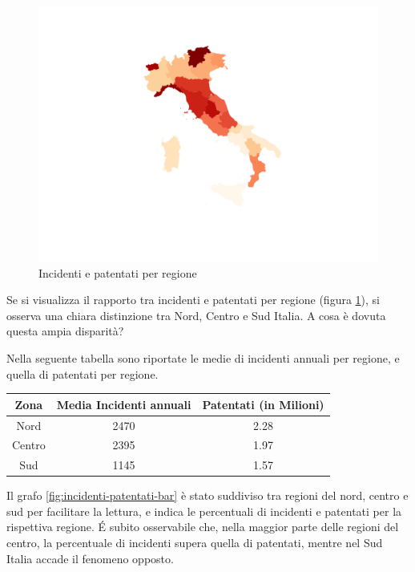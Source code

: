 \documentclass[a4paper,12pt]{report}
\begin{document}
\begin{figure}
    \hfill\includegraphics[width=0.8\linewidth]{../src/incidenti/incidenti_aci/mappe_regioni/incidenti_patenti_italia.png}\hspace*{\fill}
    \caption{Incidenti e patentati per regione}
    \label{fig:incidenti-patentati}
\end{figure}

Se si visualizza il rapporto tra incidenti e patentati per regione 
(figura \ref{fig:incidenti-patentati}), si osserva una chiara distinzione 
tra Nord, Centro e Sud Italia. 
A cosa è dovuta questa ampia disparità?

Nella seguente tabella sono riportate le medie di incidenti annuali per regione, 
e quella di patentati per regione.

\begin{center}
    \def\arraystretch{1.5}%
    \begin{tabular}{ |c|c|c| } 
    \hline
    Zona & Media Incidenti annuali & Patentati (in Milioni) \\ 
    \hline
    \rowcolor{TableGray}
    Nord    &   2470 &   2.28 \\ 
    Centro  &   2395 &   1.97 \\ 
    \rowcolor{TableGray}
    Sud     &   1145 &   1.57 \\ 
    \hline
    \end{tabular}
\end{center}

Il grafo \ref{fig:incidenti-patentati-bar} è stato suddiviso tra regioni del nord, 
centro e sud per facilitare la lettura, e indica le percentuali di incidenti e 
patentati per la rispettiva regione. 
\'E subito osservabile che, nella maggior parte delle regioni del centro, 
la percentuale di incidenti supera quella di patentati, 
mentre nel Sud Italia accade il fenomeno opposto.
\end{document}
